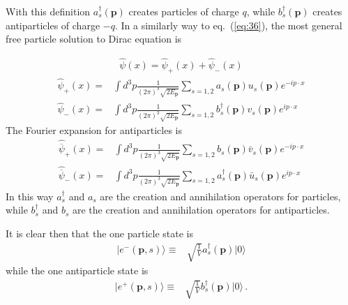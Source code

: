With this definition $a^\dagger_s(\mathbf{p})$ creates particles of charge $q$, while $b^\dagger_s(\mathbf{p})$ creates antiparticles of charge $-q$.
In a similarly way to eq.~(\ref{eq:36}), the most general free particle solution to Dirac equation is
\begin{frame}
\begin{align}
  \widehat{\psi}(x)=\widehat{\psi}_+(x)+\widehat{\psi}_-(x)
\end{align}
\begin{align}
\label{eq:83}
  \widehat{\psi}_+(x)=&\int d^3p \frac{1}{(2\pi)^3\sqrt{2E_\mathbf{p}}}\sum_{s=1,2}{a}_s(\mathbf{p})u_s(\mathbf{p})e^{-i p\cdot x} 
  \nonumber\\
  \widehat{\psi}_-(x)=&\int d^3p \frac{1}{(2\pi)^3\sqrt{2E_\mathbf{p}}}\sum_{s=1,2}{b}_s^\dagger(\mathbf{p})v_s(\mathbf{p})e^{i p\cdot x} 
\end{align}
The Fourier expansion for antiparticles is 
\begin{align}
\label{eq:78}
  \widehat{\overline{\psi}}_+(x)=&\int d^3p \frac{1}{(2\pi)^3\sqrt{2E_\mathbf{p}}}\sum_{s=1,2}{b}_s(\mathbf{p})\bar{v}_s(\mathbf{p})e^{-i p\cdot x} 
  \nonumber\\
  \widehat{\overline{\psi}}_-(x)=&\int d^3p \frac{1}{(2\pi)^3\sqrt{2E_\mathbf{p}}}\sum_{s=1,2}{a}_s^\dagger(\mathbf{p})\bar{u}_s(\mathbf{p})e^{i p\cdot x} 
\end{align}
In this way $a_s^\dagger$ and $a_s$ are the creation and annihilation operators for particles, while $b_s^\dagger$ and $b_s$ are the creation and annihilation operators for antiparticles.
\end{frame}

\begin{frame}
It is clear then that the one particle state is
\begin{align}
\label{eq:79fa}
   | e^-(\mathbf{p},s)\rangle\equiv&\sqrt{\frac{1}{V}}a^\dagger_s(\mathbf{p})|0\rangle
\end{align}
while the one antiparticle state is
\begin{align}
\label{eq:79fb}
     | e^+(\mathbf{p},s)\rangle\equiv&\sqrt{\frac{1}{V}}{b}^\dagger_s(\mathbf{p})|0\rangle\,.
\end{align}
\end{frame}

